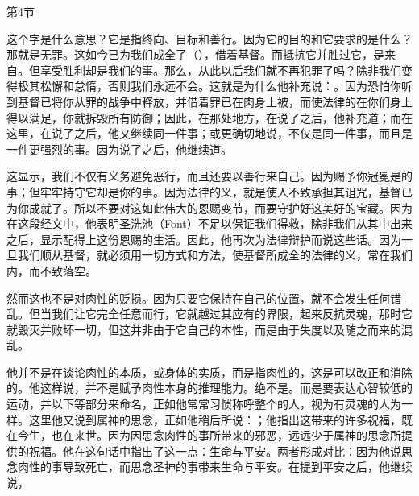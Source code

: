 第4节\par

这个字是什么意思？它是指终向、目标和善行。因为它的目的和它要求的是什么？那就是无罪。这如今已为我们成全了（），借着基督。而抵抗它并胜过它，是来自。但享受胜利却是我们的事。那么，从此以后我们就不再犯罪了吗？除非我们变得极其松懈和怠惰，否则我们永远不会。这就是为什么他补充说：。因为恐怕你听到基督已将你从罪的战争中释放，并借着罪已在肉身上被，而使法律的在你们身上得以满足，你就拆毁所有防御；因此，在那处地方，在说了之后，他补充道；而在这里，在说了之后，他又继续同一件事；或更确切地说，不仅是同一件事，而且是一件更强烈的事。因为说了之后，他继续道。\par

这显示，我们不仅有义务避免恶行，而且还要以善行来自己。因为赐予你冠冕是的事；但牢牢持守它却是你的事。因为法律的义，就是使人不致承担其诅咒，基督已为你成就了。所以不要对这如此伟大的恩赐变节，而要守护好这美好的宝藏。因为在这段经文中，他表明圣洗池（Font）不足以保证我们得救，除非我们从其中出来之后，显示配得上这份恩赐的生活。因此，他再次为法律辩护而说这些话。因为一旦我们顺从基督，就必须用一切方式和方法，使基督所成全的法律的义，常在我们内，而不致落空。\par

\par

然而这也不是对肉性的贬损。因为只要它保持在自己的位置，就不会发生任何错乱。但当我们让它完全任意而行，它就越过其应有的界限，起来反抗灵魂，那时它就毁灭并败坏一切，但这并非由于它自己的本性，而是由于失度以及随之而来的混乱。\par

他并不是在谈论肉性的本质，或身体的实质，而是指肉性的，这是可以改正和消除的。他这样说，并不是赋予肉性本身的推理能力。绝不是。而是要表达心智较低的运动，并以下等部分来命名，正如他常常习惯称呼整个的人，视为有灵魂的人为一样。这里他又说到属神的思念，正如他稍后所说：；他指出这带来的许多祝福，既在今生，也在来世。因为因思念肉性的事所带来的邪恶，远远少于属神的思念所提供的祝福。他在这句话中指出了这一点：生命与平安。两者形成对比：因为他说思念肉性的事导致死亡，而思念圣神的事带来生命与平安。在提到平安之后，他继续说，\par

